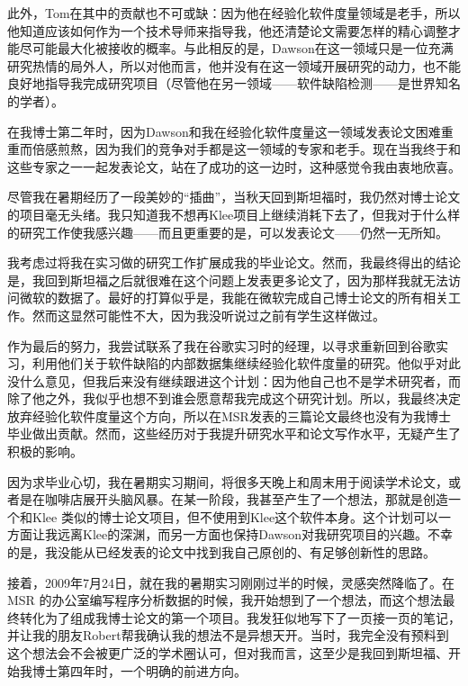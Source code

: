 \documentclass[12pt,UTF8,nofonts]{book}
\begin{document}
此外，Tom在其中的贡献也不可或缺：因为他在经验化软件度量领域是老手，所以他知道应该如何作为一个技术导师来指导我，他还清楚论文需要怎样的精心调整才能尽可能最大化被接收的概率。与此相反的是，Dawson在这一领域只是一位充满研究热情的局外人，所以对他而言，他并没有在这一领域开展研究的动力，也不能良好地指导我完成研究项目（尽管他在另一领域——软件缺陷检测——是世界知名的学者）。

在我博士第二年时，因为Dawson和我在经验化软件度量这一领域发表论文困难重重而倍感煎熬，因为我们的竞争对手都是这一领域的专家和老手。现在当我终于和这些专家之一一起发表论文，站在了成功的这一边时，这种感觉令我由衷地欣喜。

\breakline

尽管我在暑期经历了一段美妙的“插曲”，当秋天回到斯坦福时，我仍然对博士论文的项目毫无头绪。我只知道我不想再Klee项目上继续消耗下去了，但我对于什么样的研究工作使我感兴趣——而且更重要的是，可以发表论文——仍然一无所知。

我考虑过将我在实习做的研究工作扩展成我的毕业论文。然而，我最终得出的结论是，我回到斯坦福之后就很难在这个问题上发表更多论文了，因为那样我就无法访问微软的数据了。最好的打算似乎是，我能在微软完成自己博士论文的所有相关工作。然而这显然可能性不大，因为我没听说过之前有学生这样做过。

作为最后的努力，我尝试联系了我在谷歌实习时的经理，以寻求重新回到谷歌实习，利用他们关于软件缺陷的内部数据集继续经验化软件度量的研究。他似乎对此没什么意见，但我后来没有继续跟进这个计划：因为他自己也不是学术研究者，而除了他之外，我似乎也想不到谁会愿意帮我完成这个研究计划。所以，我最终决定放弃经验化软件度量这个方向，所以在MSR发表的三篇论文最终也没有为我博士毕业做出贡献。然而，这些经历对于我提升研究水平和论文写作水平，无疑产生了积极的影响。

因为求毕业心切，我在暑期实习期间，将很多天晚上和周末用于阅读学术论文，或者是在咖啡店展开头脑风暴。在某一阶段，我甚至产生了一个想法，那就是创造一个和Klee 类似的博士论文项目，但不使用到Klee这个软件本身。这个计划可以一方面让我远离Klee的深渊，而另一方面也保持Dawson对我研究项目的兴趣。不幸的是，我没能从已经发表的论文中找到我自己原创的、有足够创新性的思路。

接着，2009年7月24日，就在我的暑期实习刚刚过半的时候，灵感突然降临了。在MSR 的办公室编写程序分析数据的时候，我开始想到了一个想法，而这个想法最终转化为了组成我博士论文的第一个项目。我发狂似地写下了一页接一页的笔记，并让我的朋友Robert帮我确认我的想法不是异想天开。当时，我完全没有预料到这个想法会不会被更广泛的学术圈认可，但对我而言，这至少是我回到斯坦福、开始我博士第四年时，一个明确的前进方向。

\end{document}
